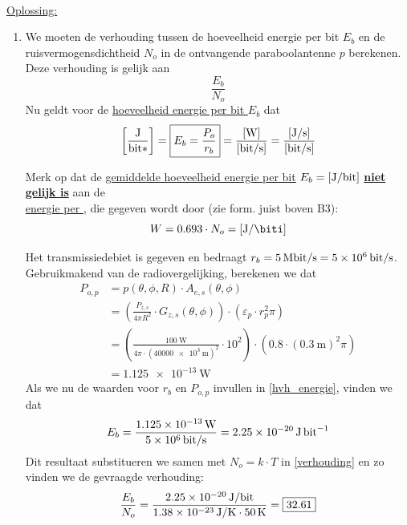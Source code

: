 \documentclass[kulak]{kulakarticle}
\let\epsilon\varepsilon
\begin{document}
	\hfill \\
	\underline{Oplossing:}
	\begin{enumerate}
		\item We moeten de verhouding tussen de hoeveelheid energie per bit \(E_b\) en de ruisvermogensdichtheid \(N_o\) in de ontvangende paraboolantenne \(p\) berekenen. Deze verhouding is gelijk aan \begin{equation}
			\frac{E_b}{N_o} \label{verhouding}
		\end{equation} Nu geldt voor de \underline{hoeveelheid energie per bit \(E_b\)} dat \begin{equation}
			\left[\frac{\unit{\joule}}{\unit{\bit*}}\right] = \boxed{E_b = \frac{P_o}{r_b}} = \frac{[\unit{\watt}]}{[\unit{\bit/\second}]} = \frac{[\unit{\joule/\second}]}{[\unit{bit/\second}]} \label{hvh_energie}
		\end{equation}

		Merk op dat de \underline{gemiddelde hoeveelheid energie per bit} \(E_b = [\unit{\joule/\bit}]\) \underline{\textbf{niet gelijk is}} aan de \\\underline{energie per \unit{\biti}}, die gegeven wordt door (zie form. juist boven B3): \[W=0.693 \cdot N_o = \left[\unit{\joule\per\biti}\right]\]

		Het transmissiedebiet is gegeven en bedraagt \(r_b=\SI{5}{\mega\bit/\second}=\SI{5e6}{\bit/\second}\).\\ Gebruikmakend van de radiovergelijking, berekenen we dat \begin{align*}
			P_{o,p} &= p(\theta,\phi,R) \cdot A_{e,s}(\theta,\phi) \\
			&= \left(\frac{P_{z,s}}{4\pi R^2} \cdot G_{z,s}(\theta,\phi) \right) \cdot \left( \epsilon_p \cdot r_p^2 \pi \right) \\
			&= \left(\frac{\SI{100}{\watt}}{4\pi \cdot (\SI{40000e3}{\meter})^2} \cdot 10^2 \right) \cdot \left( 0.8 \cdot (\SI{0.3}{\meter})^2 \pi \right) \\
			&= \SI{1.125e-13}{\watt}
		\end{align*}
		Als we nu de waarden voor \(r_b\) en \(P_{o,p}\) invullen in \eqref{hvh_energie}, vinden we dat \begin{equation*}
			E_b = \frac{\SI{1.125e-13}{\watt}}{\SI{5e6}{\bit/\second}} = \SI{2.25e-20}{\joule\per\bit}
		\end{equation*} Dit resultaat substitueren we samen met \(N_o = k\cdot T \) in \eqref{verhouding} en zo vinden we de gevraagde verhouding: \begin{equation*}
		\frac{E_b}{N_o} = \frac{\SI{2.25e-20}{\joule/\bit}}{\SI{1.38e-23}{\joule/\kelvin}\cdot\SI{50}{\kelvin}} = \boxed{32.61}
		\end{equation*}


\end{enumerate}
\end{document}
